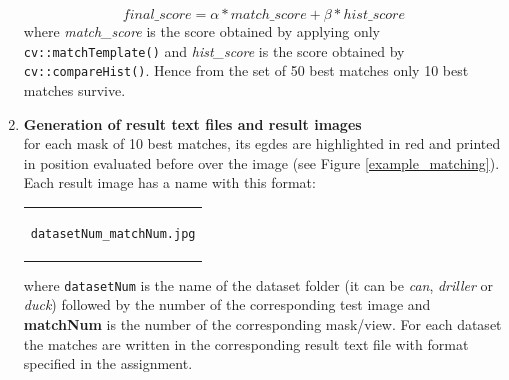 \documentclass{article}
\begin{document}
\begin{enumerate}
{\begin{itemize}
{$$final\_score=\alpha*match\_score + \beta*hist\_score$$
where \textit{match\_score} is the score obtained by applying only \texttt{cv::matchTemplate()} and \textit{hist\_score} is the score obtained by \texttt{cv::compareHist()}. Hence from the set of 50 best matches only 10 best matches survive.}
\end{itemize}
}
\item{\textbf{Generation of result text files and result images}\\
for each mask of 10 best matches, its egdes are highlighted in red and printed in position evaluated before over the image (see Figure \ref{example_matching}). Each result image has a name with this format:
\begin{center}
\begin{tabular}{c}
\begin{lstlisting}[linewidth=120pt, basicstyle=\footnotesize\sffamily,]
datasetNum_matchNum.jpg
\end{lstlisting}
\end{tabular}
\end{center}
where \texttt{datasetNum} is the name of the dataset folder (it can be \textit{can}, \textit{driller} or \textit{duck}) followed by the number of the corresponding test image and \textbf{matchNum} is the number of the corresponding mask/view.
For each dataset the matches are written in the corresponding result text file with format specified in the assignment.}
\end{enumerate}
\end{document}
